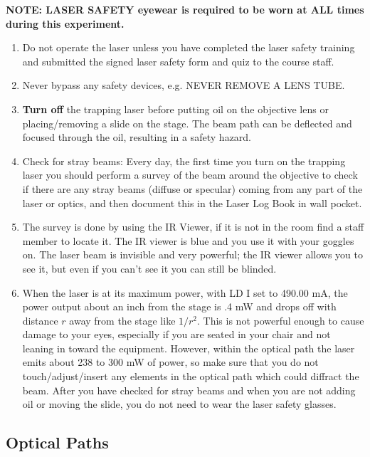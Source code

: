 \documentclass{../lab}
\begin{document}
\textbf{NOTE: LASER  SAFETY eyewear is required to be worn at ALL times during this experiment.}

\begin{enumerate}
    \item Do not operate the laser unless you have completed the laser safety training and submitted the signed laser safety form and quiz to the course staff.

    \item Never bypass any safety devices, e.g. NEVER REMOVE A LENS TUBE.

    \item \textbf{Turn off} the trapping laser before putting oil on the objective lens or placing/removing a slide on the stage. The beam path can be deflected and focused through the oil, resulting in a safety hazard.

    \item Check for stray beams: Every day, the first time you turn on the trapping laser you should perform a survey of the beam around the objective to check if there are any stray beams (diffuse or specular) coming from any part of the laser or optics, and then document this in the Laser Log Book in wall pocket.

    \item The survey is done by using the IR Viewer, if it is not in the room find a staff member to locate it. The IR viewer is blue and you use it with your goggles on. The laser beam is invisible and very powerful; the IR viewer allows you to see it, but even if you can't see it you can still be blinded.

    \item When the laser is at its maximum power, with LD I set to 490.00 mA, the power output about an inch from the stage is .4 mW and drops off with distance $r$ away from the stage like $1/r^2$. This is not powerful enough to cause damage to your eyes, especially if you are seated in your chair and not leaning in toward the equipment. However, within the optical path the laser emits about 238 to 300 mW of power, so make sure that you do not touch/adjust/insert any elements in the optical path which could diffract the beam. After you have checked for stray beams and when you are not adding oil or moving the slide, you do not need to wear the laser safety glasses.

\end{enumerate}

\subsection{Optical Paths}
\end{document}
